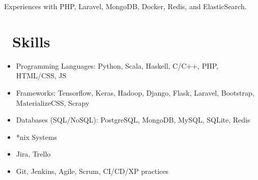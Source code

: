 \documentclass{resume}
\begin{document}
Experiences with PHP, Laravel, MongoDB, Docker, Redis, and ElasticSearch.

\section{\faCogs\ Skills}
\begin{itemize}[parsep=0.5ex]
  \item Programming Languages: Python, Scala, Haskell, C/C++, PHP, HTML/CSS, JS
  \item Frameworks: Tensorflow, Keras, Hadoop, Django, Flask, Laravel, Bootstrap, MaterializeCSS, Scrapy
  \item Databases (SQL/NoSQL): PostgreSQL, MongoDB, MySQL, SQLite, Redis
  \item *nix Systems
  \item Jira, Trello
  \item Git, Jenkins, Agile, Scrum, CI/CD/XP practices
\end{itemize}

\clearpage
\end{document}
